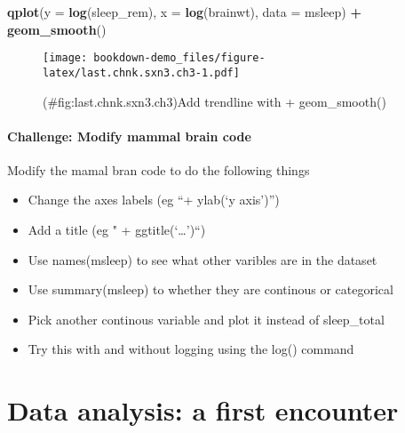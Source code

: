 \documentclass[]{book}
\newenvironment{Shaded}{\begin{snugshade}}{\end{snugshade}}
\newcommand{\KeywordTok}[1]{\textcolor[rgb]{0.13,0.29,0.53}{\textbf{#1}}}
\newcommand{\DataTypeTok}[1]{\textcolor[rgb]{0.13,0.29,0.53}{#1}}
\newcommand{\StringTok}[1]{\textcolor[rgb]{0.31,0.60,0.02}{#1}}
\newcommand{\OperatorTok}[1]{\textcolor[rgb]{0.81,0.36,0.00}{\textbf{#1}}}
\newcommand{\NormalTok}[1]{#1}
\providecommand{\tightlist}{%
  \setlength{\itemsep}{0pt}\setlength{\parskip}{0pt}}
\theoremstyle{definition}
\theoremstyle{definition}
\theoremstyle{definition}
\theoremstyle{remark}
\begin{document}
\begin{Shaded}
\begin{Highlighting}[]
\KeywordTok{qplot}\NormalTok{(}\DataTypeTok{y =} \KeywordTok{log}\NormalTok{(sleep_rem),}
      \DataTypeTok{x =} \KeywordTok{log}\NormalTok{(brainwt), }
      \DataTypeTok{data =}\NormalTok{ msleep) }\OperatorTok{+}
\StringTok{  }\KeywordTok{geom_smooth}\NormalTok{()}
\end{Highlighting}
\end{Shaded}

\begin{figure}
\centering
\texttt{[image: bookdown-demo\_files/figure-latex/last.chnk.sxn3.ch3-1.pdf]}
\caption{(\#fig:last.chnk.sxn3.ch3)Add trendline with + geom\_smooth()}
\end{figure}

\subsection{Challenge: Modify mammal brain
code}\label{challenge-modify-mammal-brain-code}

Modify the mamal bran code to do the following things

\begin{itemize}
\tightlist
\item
  Change the axes labels (eg ``+ ylab(`y axis')'')
\item
  Add a title (eg " + ggtitle(`\ldots{}')``)
\item
  Use names(msleep) to see what other varibles are in the dataset
\item
  Use summary(msleep) to whether they are continous or categorical
\item
  Pick another continous variable and plot it instead of sleep\_total
\item
  Try this with and without logging using the log() command
\end{itemize}

\part{Data analysis: a first
encounter}\label{part-data-analysis-a-first-encounter}

\hypertarget{section-3}{\subsection*{}\label{section-3}}
\end{document}
